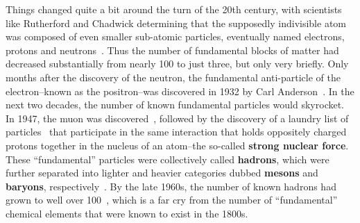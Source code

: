 Things changed quite a bit around the turn of the 20th century, with scientists like Rutherford and Chadwick determining that the supposedly indivisible atom was composed of even smaller sub-atomic particles, eventually named electrons, protons and neutrons~\cite{Electrons, Protons, Neutrons}. Thus the number of fundamental blocks of matter had decreased substantially from nearly 100 to just three, but only very briefly. Only months after the discovery of the neutron, the fundamental anti-particle of the electron--known as the positron--was discovered in 1932 by Carl Anderson~\cite{Positron}. In the next two decades, the number of known fundamental particles would skyrocket. In 1947, the muon was discovered~\cite{Muon}, followed by the discovery of a laundry list of particles~\cite{Kaon,Lambda,Sigma} that participate in the same interaction that holds oppositely charged protons together in the nucleus of an atom--the so-called \textbf{strong nuclear force}. These ``fundamental'' particles were collectively called \textbf{hadrons}, which were further separated into lighter and heavier categories dubbed \textbf{mesons} and \textbf{baryons}, respectively~\cite{MesonBaryon}. By the late 1960s, the number of known hadrons had grown to well over 100~\cite{ParticleDiscoveries}, which is a far cry from the number of ``fundamental'' chemical elements that were known to exist in the 1800s.

